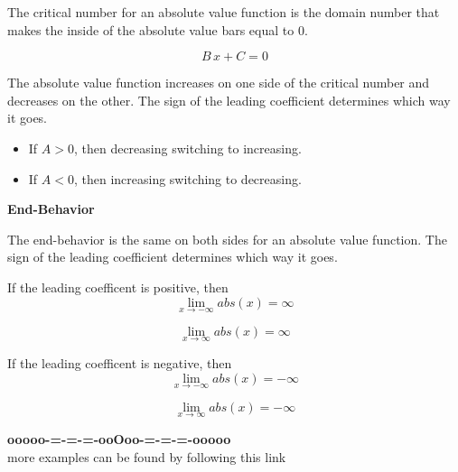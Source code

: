 \documentclass{ximera}
\begin{document}
The critical number for an absolute value function is the domain number that makes the inside of the absolute value bars equal to $0$.


\[
B \, x + C = 0
\]


The absolute value function increases on one side of the critical number and decreases on the other.  The sign of the leading coefficient determines which way it goes. 




\begin{itemize}
  \item If $A > 0$, then decreasing switching to increasing.
  \item If $A < 0$, then increasing switching to decreasing.
\end{itemize}










\textbf{End-Behavior}


The end-behavior is the same on both sides for an absolute value function. The sign of the leading coefficient determines which way it goes.


If the leading coefficent is positive, then 
\[
\lim_{x \to -\infty} abs(x) = \infty 
\]
 
\[
\lim_{x \to \infty} abs(x) = \infty 
\]







If the leading coefficent is negative, then 
\[
\lim_{x \to -\infty} abs(x) = -\infty 
\]
 
\[
\lim_{x \to \infty} abs(x) = -\infty 
\]





















\begin{center}
\textbf{\textcolor{green!50!black}{ooooo-=-=-=-ooOoo-=-=-=-ooooo}} \\

more examples can be found by following this link\\ 

\end{center}
\end{document}
